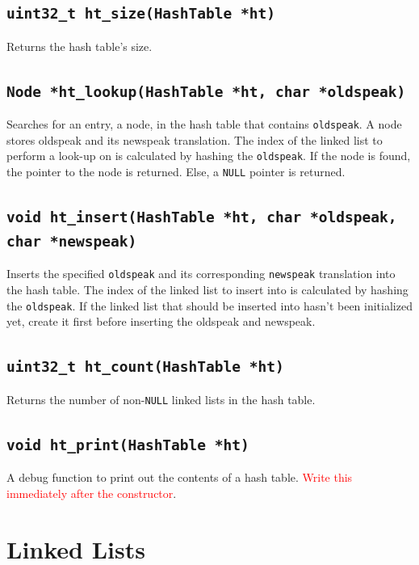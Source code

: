\documentclass{article}
\begin{document}
\subsection{\texttt{uint32\_t ht\_size(HashTable *ht)}}

Returns the hash table's size.

\subsection{\texttt{Node *ht\_lookup(HashTable *ht, char *oldspeak)}}

Searches for an entry, a node, in the hash table that contains
\texttt{oldspeak}. A node stores oldspeak and its newspeak translation.
The index of the linked list to perform a look-up on is calculated by
hashing the \texttt{oldspeak}. If the node is found, the pointer to the
node is returned. Else, a \texttt{NULL} pointer is returned.

\subsection{\texttt{void ht\_insert(HashTable *ht, char *oldspeak,
char *newspeak)}}

Inserts the specified \texttt{oldspeak} and its corresponding
\texttt{newspeak} translation into the hash table. The index of the
linked list to insert into is calculated by hashing the
\texttt{oldspeak}. If the linked list that should be inserted into
hasn't been initialized yet, create it first before inserting the
oldspeak and newspeak.

\subsection{\texttt{uint32\_t ht\_count(HashTable *ht)}}

Returns the number of non-\texttt{NULL} linked lists in the hash table.

\subsection{\texttt{void ht\_print(HashTable *ht)}}

A debug function to print out the contents of a hash table. \textcolor{red}{Write this
immediately after the constructor}.

\section{Linked Lists}
\end{document}
